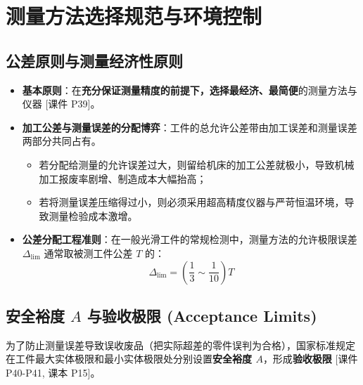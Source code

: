 \documentclass[11pt,a4paper]{ctexart}
\begin{document}
\newpage
\section{测量方法选择规范与环境控制}

\subsection{公差原则与测量经济性原则}
\begin{itemize}[leftmargin=1.5em, itemsep=3pt]
    \item \textbf{基本原则}：在\textbf{充分保证测量精度的前提下，选择最经济、最简便}的测量方法与仪器 \hfill\textsf{[课件 P39]}。
    \item \textbf{加工公差与测量误差的分配博弈}：工件的总允许公差带由加工误差和测量误差两部分共同占有。
    \begin{itemize}
        \item 若分配给测量的允许误差过大，则留给机床的加工公差就极小，导致机械加工报废率剧增、制造成本大幅抬高；
        \item 若将测量误差压缩得过小，则必须采用超高精度仪器与严苛恒温环境，导致测量检验成本激增。
    \end{itemize}
    \item \textbf{公差分配工程准则}：在一般光滑工件的常规检测中，测量方法的允许极限误差 $\Delta_{\lim}$ 通常取被测工件公差 $T$ 的：
    \begin{equation}
    \Delta_{\lim} = \left(\frac{1}{3} \sim \frac{1}{10}\right) T
    \end{equation}
\end{itemize}

\subsection{安全裕度 $A$ 与验收极限 (Acceptance Limits)}
为了防止测量误差导致误收废品（把实际超差的零件误判为合格），国家标准规定在工件最大实体极限和最小实体极限处分别设置\textbf{安全裕度 $A$}，形成\textbf{验收极限} \hfill\textsf{[课件 P40-P41, 课本 P15]}。
\end{document}

